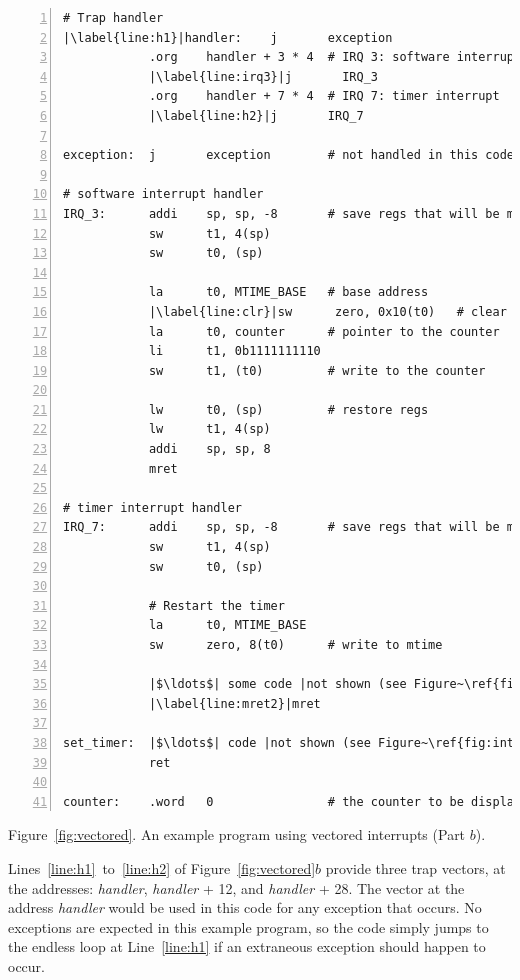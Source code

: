 \documentclass[11pt, twoside, pdftex]{article}
\begin{document}
\begin{center}
\begin{minipage}[h]{15 cm}
\begin{lstlisting}[style=defaultNiosVStyle, name=vecs, numbers=left, escapechar=|]
# Trap handler
|\label{line:h1}|handler:    j       exception
            .org    handler + 3 * 4  # IRQ 3: software interrupt
            |\label{line:irq3}|j       IRQ_3
            .org    handler + 7 * 4  # IRQ 7: timer interrupt
            |\label{line:h2}|j       IRQ_7

exception:  j       exception        # not handled in this code
            
# software interrupt handler
IRQ_3:      addi    sp, sp, -8       # save regs that will be modified
            sw      t1, 4(sp)
            sw      t0, (sp)

            la      t0, MTIME_BASE   # base address
            |\label{line:clr}|sw      zero, 0x10(t0)   # clear software interrupt in msip
            la      t0, counter      # pointer to the counter
            li      t1, 0b1111111110
            sw      t1, (t0)         # write to the counter

            lw      t0, (sp)         # restore regs
            lw      t1, 4(sp)
            addi    sp, sp, 8
            mret

# timer interrupt handler
IRQ_7:      addi    sp, sp, -8       # save regs that will be modified
            sw      t1, 4(sp)
            sw      t0, (sp)
            
            # Restart the timer
            la      t0, MTIME_BASE
            sw      zero, 8(t0)      # write to mtime

            |$\ldots$| some code |not shown (see Figure~\ref{fig:ints})|
            |\label{line:mret2}|mret

set_timer:  |$\ldots$| code |not shown (see Figure~\ref{fig:ints})|
            ret

counter:    .word   0                # the counter to be displayed
\end{lstlisting}

\vspace{0.25in}
Figure~\ref{fig:vectored}.	An example program using vectored interrupts (Part $b$).
\end{minipage}
\end{center}

Lines~\ref{line:h1}~to~\ref{line:h2} of Figure~\ref{fig:vectored}$b$ provide three
trap vectors, at the addresses: {\it handler}, {\it handler} + 12, and {\it handler} + 28.
The vector at the address {\it handler} would be used in this code for any exception that
occurs. No exceptions are expected in this example program, so the code simply jumps to the
endless loop at Line~\ref{line:h1} if an extraneous exception should happen to occur. 
\end{document}
